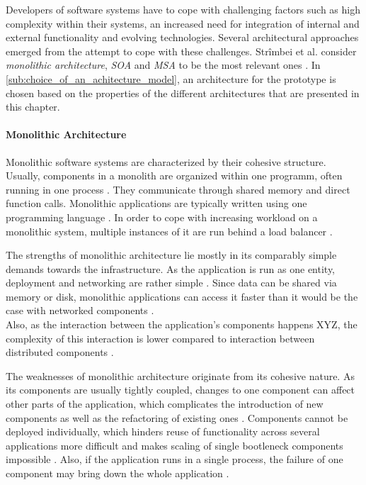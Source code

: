 Developers of software systems have to cope with challenging factors such as high complexity within their systems, an increased need for integration of internal and external functionality and evolving technologies. Several architectural approaches emerged from the attempt to cope with these challenges. Strîmbei et al. consider \emph{monolithic architecture}, \emph{\ac{SOA}} and \emph{\ac{MSA}} to be the most relevant ones \cite[p.~13]{Strimbei2015Software}. In \ref{sub:choice_of_an_achitecture_model}, an architecture for the prototype is chosen based on the properties of the different architectures that are presented in this chapter.

\paragraph{Monolithic Architecture} %
\label{par:monolithic_architecture}
Monolithic software systems are characterized by their cohesive structure. Usually, components in a monolith are organized within one programm, often running in one process \cite[p.~35]{Stubbs2015Distributed}. They communicate through shared memory and direct function calls. Monolithic applications are typically written using one programming language \cite[p.~14]{Strimbei2015Software}. In order to cope with increasing workload on a monolithic system, multiple instances of it are run behind a load balancer \cite[p.~35]{Stubbs2015Distributed}.

The strengths of monolithic architecture lie mostly in its comparably simple demands towards the infrastructure. As the application is run as one entity, deployment and networking are rather simple \cite[p.~35]{Stubbs2015Distributed}. Since data can be shared via memory or disk, monolithic applications can access it faster than it would be the case with networked components \cite[p.~14]{Strimbei2015Software}. \\
Also, as the interaction between the application's components happens XYZ, the complexity of this interaction is lower compared to interaction between distributed components \cite[p.~14]{Strimbei2015Software}.

The weaknesses of monolithic architecture originate from its cohesive nature. As its components are usually tightly coupled, changes to one component can affect other parts of the application, which complicates the introduction of new components as well as the refactoring of existing ones \cite{Stubbs2015Distributed}.
Components cannot be deployed individually, which hinders reuse of functionality across several applications more difficult and makes scaling of single bootleneck components impossible \cite{Stubbs2015Distributed}. Also, if the application runs in a single process, the failure of one component may bring down the whole application \cite[p.~5]{Newman2015Building}.

